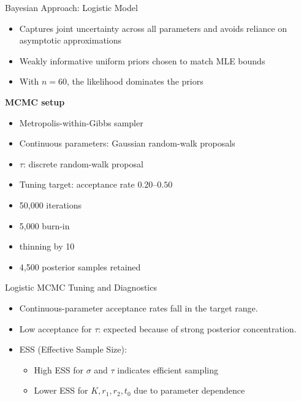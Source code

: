 \documentclass[
  ignorenonframetext,
  aspectratio=169,
]{beamer}
\providecommand{\tightlist}{%
  \setlength{\itemsep}{0pt}\setlength{\parskip}{0pt}}\usepackage{longtable,booktabs,array}
\begin{document}
\begin{frame}{Bayesian Approach: Logistic Model}
\label{bayesian-approach-logistic-model}
\begin{itemize}
\tightlist
\item
  Captures joint uncertainty across all parameters and avoids reliance
  on asymptotic approximations
\item
  Weakly informative uniform priors chosen to match MLE bounds
\item
  With \(n = 60\), the likelihood dominates the priors
\end{itemize}

\textbf{MCMC setup}

\begin{itemize}
\tightlist
\item
  Metropolis-within-Gibbs sampler
\item
  Continuous parameters: Gaussian random-walk proposals
\item
  \(\tau\): discrete random-walk proposal
\item
  Tuning target: acceptance rate \(0.20\)--\(0.50\)
\item
  50,000 iterations
\item
  5,000 burn-in
\item
  thinning by 10
\item
  4,500 posterior samples retained
\end{itemize}
\end{frame}

\begin{frame}{Logistic MCMC Tuning and Diagnostics}
\label{logistic-mcmc-tuning-and-diagnostics}
\begin{itemize}
\item
  Continuous-parameter acceptance rates fall in the target range.
\item
  Low acceptance for \(\tau\): expected because of strong posterior
  concentration.
\item
  ESS (Effective Sample Size):

  \begin{itemize}
  \tightlist
  \item
    High ESS for \(\sigma\) and \(\tau\) indicates efficient sampling
  \item
    Lower ESS for \(K, r_1, r_2, t_0\) due to parameter dependence
  \end{itemize}
\end{itemize}
\end{frame}
\end{document}
